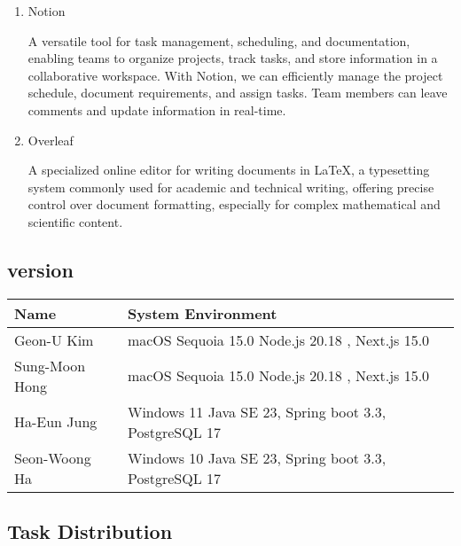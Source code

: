 \documentclass[conference]{IEEEtran}
\begin{document}
\begin{enumerate}
\item Notion

A versatile tool for task management, scheduling, and documentation, enabling teams to organize projects, track tasks, and store information in a collaborative workspace. With Notion, we can efficiently manage the project schedule, document requirements, and assign tasks. Team members can leave comments and update information in real-time.

\item Overleaf

A specialized online editor for writing documents in LaTeX, a typesetting system commonly used for academic and technical writing, offering precise control over document formatting, especially for complex mathematical and scientific content.

\end{enumerate}

\subsection{version}
\begin{table}[H] 
\renewcommand\arraystretch{1.25}
\centering 
\begin{threeparttable}
    \scriptsize
    \begin{tabular}{@{}p{3cm} p{5.3cm}@{}}
    \toprule
    \bfseries Name & \bfseries System Environment \\ 
    \midrule
    Geon-U Kim & macOS Sequoia 15.0 \newline Node.js 20.18 , Next.js 15.0\\ 
    Sung-Moon Hong & macOS Sequoia 15.0 \newline Node.js 20.18 , Next.js 15.0\\ 
    Ha-Eun Jung & Windows 11 \newline Java SE 23, Spring boot 3.3, PostgreSQL 17\\ 
    Seon-Woong Ha & Windows 10 \newline Java SE 23, Spring boot 3.3, PostgreSQL 17\\ 
    \bottomrule
    \end{tabular}
\end{threeparttable}
\end{table}


\subsection{Task Distribution}
\end{document}
